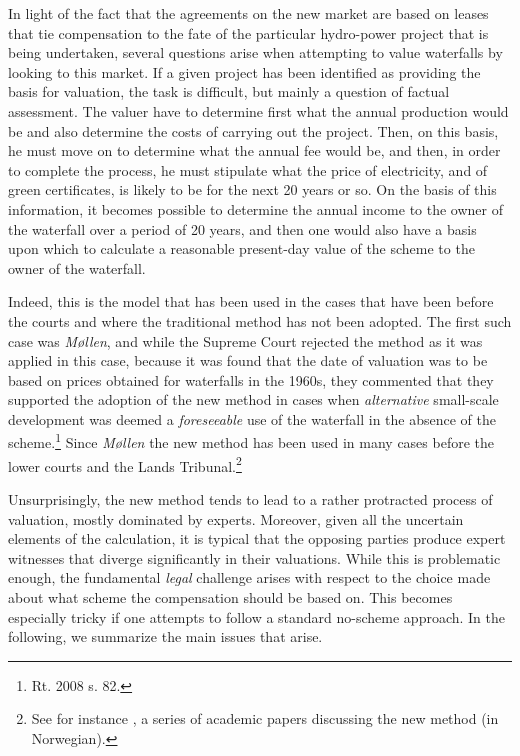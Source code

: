 In light of the fact that the agreements on the new market are based on leases that tie compensation to the fate of the particular hydro-power project that is being undertaken, several questions arise when attempting to value waterfalls by looking to this market. If a given project has been identified as providing the basis for valuation, the task is difficult, but mainly a question of factual assessment. The valuer have to determine first what the annual production would be and also determine the costs of carrying out the project. Then, on this basis, he must move on to determine what the annual fee would be, and then, in order to complete the process, he must stipulate what the price of electricity, and of green certificates, is likely to be for the next 20 years or so. On the basis of this information, it becomes possible to determine the annual income to the owner of the waterfall over a period of 20 years, and then one would also have a basis upon which to calculate a reasonable present-day value of the scheme to the owner of the waterfall. 

Indeed, this is the model that has been used in the cases that have been before the courts and where the traditional method has not been adopted. The first such case was \emph{Møllen}, and while the Supreme Court rejected the method as it was applied in this case, because it was found that the date of valuation was to be based on prices obtained for waterfalls in the 1960s, they commented that they supported the adoption of the new method in cases when \emph{alternative} small-scale development was deemed a \emph{foreseeable} use of the waterfall in the absence of the scheme.\footnote{Rt. 2008 s. 82.} 
Since \emph{Møllen} the new method has been used in many cases before the lower courts and the Lands Tribunal.\footnote{See for instance \cite{tf1,tf2,tf3}, a series of academic papers discussing the new method (in Norwegian).}

Unsurprisingly, the new method tends to lead to a rather protracted process of valuation, mostly dominated by experts. Moreover, given all the uncertain elements of the calculation, it is typical that the opposing parties produce expert witnesses that diverge significantly in their valuations. While this is problematic enough, the fundamental \emph{legal} challenge arises with respect to the choice made about what scheme the compensation should be based on. This becomes especially tricky if one attempts to follow a standard no-scheme approach. In the following, we summarize the main issues that arise.

